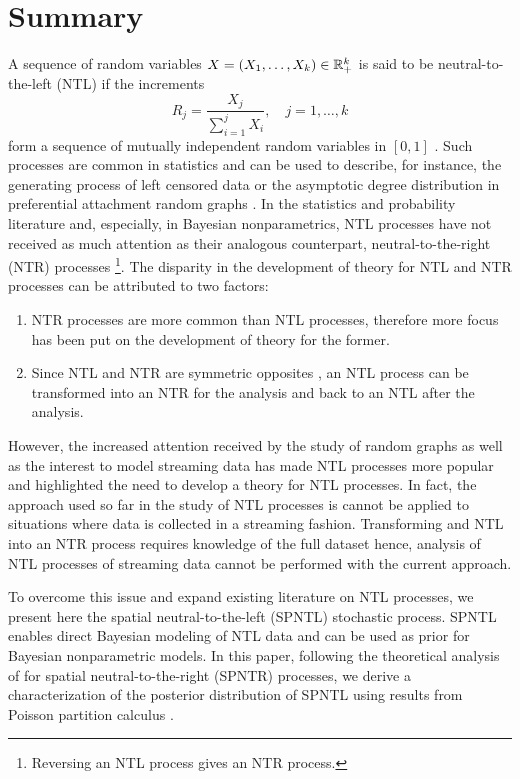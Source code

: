

\section{Summary} \label{summary}
A sequence of random variables $X = (X_1, \ldots, X_k) \in \mathbb{R}^k_+$ is said to be neutral-to-the-left (NTL) if the increments 
\begin{equation*}
R_j = \frac{X_j}{\sum_{i=1}^j X_i}, \quad j=1, \ldots, k
\end{equation*} 
form a sequence of mutually independent random variables in $[0, 1]$ \cite{bloem2018sampling}. Such processes are common in statistics and can be used to describe, for instance, the generating process of left censored data or the asymptotic degree distribution in preferential attachment random graphs \cite{bloem2017preferential}. In the statistics and probability literature and, especially, in Bayesian nonparametrics, NTL processes have not received as much attention as their analogous counterpart, neutral-to-the-right (NTR) processes \footnote{Reversing an NTL process gives an NTR process.}. The disparity in the development of theory for NTL and NTR processes can be attributed to two factors:

\begin{enumerate}
	\item NTR processes are more common than NTL processes, therefore more focus has been put on the development of theory for the former.
	\item Since NTL and NTR are symmetric opposites \cite{bloem2018sampling}, an NTL process can be transformed into an NTR for the analysis and back to an NTL after the analysis.
\end{enumerate}

However, the increased attention received by the study of random graphs as well as the interest to model streaming data has made NTL processes more popular and highlighted the need to develop a theory for NTL processes. In fact, the approach used so far in the study of NTL processes is cannot be applied to situations where data is collected in a streaming fashion. Transforming and NTL into an NTR process requires knowledge of the full dataset hence, analysis of NTL processes of streaming data cannot be performed with the current approach.

To overcome this issue and expand existing literature on NTL processes, we present here the spatial neutral-to-the-left (SPNTL) stochastic process. SPNTL enables direct Bayesian modeling of NTL data and can be used as prior for Bayesian nonparametric models. In this paper, following the theoretical analysis of \cite{james2006poisson} for spatial neutral-to-the-right (SPNTR) processes, we derive a characterization of the posterior distribution of SPNTL using results from Poisson partition calculus \cite{james2005poisson}.

